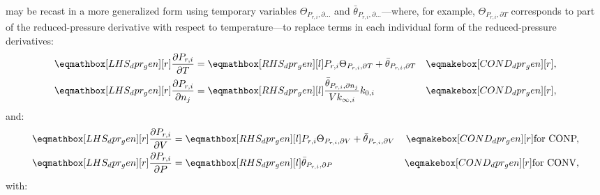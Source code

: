\documentclass[12pt]{article}
\newcommand{\conp}{CONP}
\newcommand{\conv}{CONV}
\newcommand{\dconp}{\ifmmode\text{for \conp,}\else for \conp,\fi}
\newcommand{\dconv}{\ifmmode\text{for \conv,}\else for \conv,\fi}
\begin{document}
 may be recast in a more generalized form using temporary variables $\Theta_{P_{r, i}, \partial \ldots}$ and $\bar{\theta}_{P_{r, i}, \partial \ldots}$---where, for example, $\Theta_{P_{r,i}, \partial T}$ corresponds to part of the reduced-pressure derivative with respect to temperature---to replace terms in each individual form of the reduced-pressure derivatives:
\begin{align}
 \lhs{dpr_gen}{\frac{\partial P_{r, i} }{\partial T } } &= \rhs{dpr_gen}{P_{r, i} \Theta_{P_{r,i}, \partial T} + \bar{\theta}_{P_{r, i}, \partial T}} & \cond{dpr_gen}{,} \label{e:dpr_dt} \\
 \lhs{dpr_gen}{\frac{\partial P_{r, i} }{\partial n_j}} &= \rhs{dpr_gen}{\frac{\bar{\theta}_{P_{r, i}, \partial n_j}}{V k_{\infty, i}} k_{0, i}} & \cond{dpr_gen}{,} \label{e:dpr_dnj}
\end{align}
and:
\begin{subequations}
 \label{e:dpr_de}
 \begin{align}
  \lhs{dpr_gen}{\frac{\partial P_{r, i} }{\partial V}} &= \rhs{dpr_gen}{P_{r, i} \Theta_{P_{r,i}, \partial V} + \bar{\theta}_{P_{r, i}, \partial V}} & \cond{dpr_gen}{\dconp} \\
  \lhs{dpr_gen}{\frac{\partial P_{r, i} }{\partial P}} &= \rhs{dpr_gen}{\bar{\theta}_{P_{r, i}, \partial P}} & \cond{dpr_gen}{\dconv}
 \end{align}
\end{subequations}
with:
\end{document}

